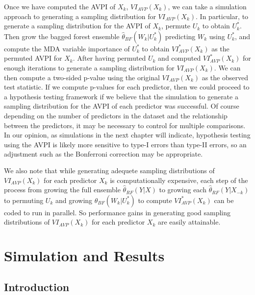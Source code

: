 \documentclass[12pt,twoside]{reedthesis}
\theoremstyle{definition}
\theoremstyle{definition}
\theoremstyle{definition}
\theoremstyle{remark}
\begin{document}
Once we have computed the AVPI of \(X_k\), \(VI_{AVP}(X_k)\), we can
take a simulation approach to generating a sampling distribution for
\(VI_{AVP}(X_k)\). In particular, to generate a sampling distribution
for the AVPI of \(X_k\), permute \(U_k\) to obtain \(U_k^*\). Then grow
the bagged forest ensemble \(\hat{\theta}_{BF}(W_k|U_k^*)\) predicting
\(W_k\) using \(U_k^*\), and compute the MDA variable importance of
\(U_k^*\) to obtain \(VI_{AVP}^*(X_k)\) as the permuted AVPI for
\(X_k\). After having permuted \(U_k\) and computed \(VI_{AVP}^*(X_k)\)
for enough iterations to generate a sampling distribution for
\(VI_{AVP}(X_k)\). We can then compute a two-sided p-value using the
original \(VI_{AVP}(X_k)\) as the observed test statistic. If we compute
p-values for each predictor, then we could proceed to a hypothesis
testing framework if we believe that the simulation to generate a
sampling distribution for the AVPI of each predictor was successful. Of
course depending on the number of predictors in the dataset and the
relationship between the predictors, it may be necessary to control for
multiple comparisons. In our opinion, as simulations in the next chapter
will indicate, hypothesis testing using the AVPI is likely more
sensitive to type-I errors than type-II errors, so an adjustment such as
the Bonferroni correction may be appropriate.

We also note that while generating adequete sampling distributions of
\(VI_{AVP}(X_k)\) for each predictor \(X_k\) is computationally
expensive, each step of the process from growing the full ensemble
\(\hat{\theta}_{RF}(Y|X)\) to growing each
\(\hat{\theta}_{RF}(Y|X_{-k})\) to permuting \(U_k\) and growing
\(\hat{\theta}_{BF}(W_k|U_k^*)\) to compute \(VI_{AVP}^*(X_k)\) can be
coded to run in parallel. So performance gains in generating good
sampling distributions of \(VI_{AVP}(X_k)\) for each predictor \(X_k\)
are easily attainable.

\chapter{Simulation and Results}\label{simulation-and-results}

\section{Introduction}\label{introduction-3}
\end{document}
